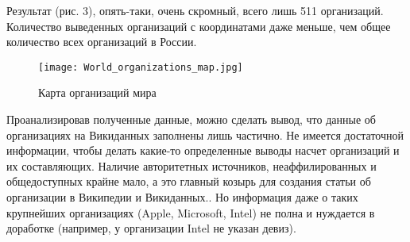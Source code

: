 Результат (рис. 3), опять-таки, очень скромный, всего лишь 511 организаций. Количество выведенных организаций с координатами даже меньше, чем общее количество всех организаций в России.

\begin{figure}[h]
	\texttt{[image: World\_organizations\_map.jpg]}
	\centering
	\caption{Карта организаций мира}
	\centering
\end{figure}

Проанализировав полученные данные, можно сделать вывод, что данные об организациях на Викиданных заполнены лишь частично. Не имеется достаточной информации, чтобы делать какие-то определенные выводы насчет организаций и их составляющих. Наличие авторитетных источников, неаффилированных и общедоступных крайне мало, а это главный козырь для создания статьи об организации в Википедии и Викиданных.. Но информация даже о таких крупнейших организациях (Apple, Microsoft, Intel) не полна и нуждается в доработке (например, у организации Intel не указан девиз).